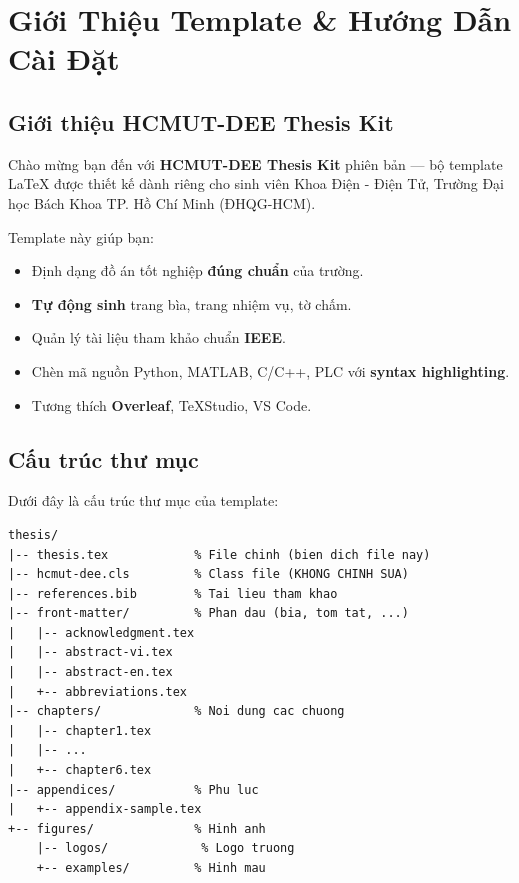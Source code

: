 
\chapter{Giới Thiệu Template \& Hướng Dẫn Cài Đặt}
\label{ch:introduction}


\section{Giới thiệu HCMUT-DEE Thesis Kit}

Chào mừng bạn đến với \textbf{HCMUT-DEE Thesis Kit} phiên bản \TemplateVersion{} --- bộ template \LaTeX{} được thiết kế dành riêng cho sinh viên Khoa Điện - Điện Tử, Trường Đại học Bách Khoa TP. Hồ Chí Minh (ĐHQG-HCM).

Template này giúp bạn:
\begin{itemize}
  \item Định dạng đồ án tốt nghiệp \textbf{đúng chuẩn} của trường.
  \item \textbf{Tự động sinh} trang bìa, trang nhiệm vụ, tờ chấm.
  \item Quản lý tài liệu tham khảo chuẩn \textbf{IEEE}.
  \item Chèn mã nguồn Python, MATLAB, C/C++, PLC với \textbf{syntax highlighting}.
  \item Tương thích \textbf{Overleaf}, TeXStudio, VS Code.
\end{itemize}

\section{Cấu trúc thư mục}
\label{sec:structure}

Dưới đây là cấu trúc thư mục của template:

\begin{lstlisting}[style=latexstyle, caption={Cấu trúc thư mục HCMUT-DEE Thesis Kit}, label={lst:tree}]
thesis/
|-- thesis.tex            % File chinh (bien dich file nay)
|-- hcmut-dee.cls         % Class file (KHONG CHINH SUA)
|-- references.bib        % Tai lieu tham khao
|-- front-matter/         % Phan dau (bia, tom tat, ...)
|   |-- acknowledgment.tex
|   |-- abstract-vi.tex
|   |-- abstract-en.tex
|   +-- abbreviations.tex
|-- chapters/             % Noi dung cac chuong
|   |-- chapter1.tex
|   |-- ...
|   +-- chapter6.tex
|-- appendices/           % Phu luc
|   +-- appendix-sample.tex
+-- figures/              % Hinh anh
    |-- logos/             % Logo truong
    +-- examples/         % Hinh mau
\end{lstlisting}

